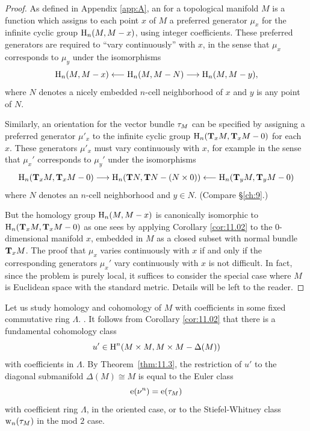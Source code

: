 \documentclass[../main]{subfiles}
\begin{document}
\begin{proof}
As defined in Appendix \ref{app:A}, an  for a topological manifold $M$ is a function which assigns to each point $x$ of $M$ a preferred generator $\mu_x$ for the infinite cyclic group $\homology_n(M, M - x)$, using integer coefficients. These preferred generators are required to ``vary continuously'' with $x$, in the sense that $\mu_x$ corresponds to $\mu_y$ under the isomorphisms \[\homology_n(M, M - x) \longleftarrow \homology_n(M, M - N) \longrightarrow \homology_n(M, M - y),\] where $N$ denotes a nicely embedded $n$-cell neighborhood of $x$ and $y$ is any point of $N$. 

Similarly, an orientation for the vector bundle $\tangentbundle M$ can be specified by assigning a preferred generator $\mu'_x$ to the infinite cyclic group $\homology_n(\tangentspace M x, \tangentspace M x - 0)$ for each $x$. These generators $\mu'_x$ must vary continuously with $x$, for example in the sense that $\mu_x'$ corresponds to $\mu_y'$ under the isomorphisms \[\homology_n(\tangentspace M x, \tangentspace M x - 0) \longrightarrow \homology_n(\tangentTS N, \tangentTS N - (N \times 0)) \longleftarrow \homology_n(\tangentspace M y, \tangentspace M y - 0)\] where $N$ denotes an $n$-cell neighborhood and $y \in N$. (Compare \S\ref{ch:9}.)

But the homology group $\homology_n(M, M - x)$ is canonically isomorphic to\newline $\homology_n(\tangentspace M x, \tangentspace M x - 0)$ as one sees by applying Corollary \ref{cor:11.02} to the $0$-dimensional manifold $x$, embedded in $M$ as a closed subset with normal bundle $\tangentspace M x$. The proof that $\mu_x$ varies continuously with $x$ if and only if the corresponding generators $\mu_x'$ vary continuously with $x$ is not difficult. In fact, since the problem is purely local, it suffices to consider the special case where $M$ is Euclidean space with the standard metric. Details will be left to the reader.
\end{proof}

Let us study homology and cohomology of $M$ with coefficients in some fixed commutative ring $\Lambda$. . It follows from Corollary \ref{cor:11.02} that there is a fundamental cohomology class \[u' \in \homology^n(M \times M, M \times M - \Delta(M))\] with coefficients in $\Lambda$. By Theorem~\ref{thm:11.3}, the restriction of $u'$ to the diagonal submanifold $\Delta(M) \cong M$ is equal to the Euler class \[\eulerclass(\nu^n) = \eulerclass(\tangentbundle M)\] with coefficient ring $\Lambda$, in the oriented case, or to the Stiefel-Whitney class $\sw_n(\tangentbundle M)$ in the mod $2$ case.
\end{document}
